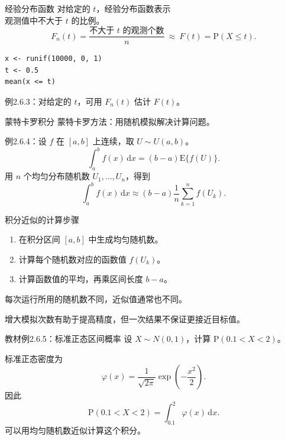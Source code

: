 \documentclass[14pt,compress,t,noamsthm,notheorem,table,handout,fontset=none]{ctexbeamer}
\newcommand{\inputlabel}{\par\smallskip{\fontsize{10.5}{13}\selectfont\bfseries\color{muted}输入代码\par}}
\begin{document}
\begin{frame}[fragile]{经验分布函数}
  对给定的 $t$，经验分布函数表示\\
  观测值中不大于 $t$ 的比例。
  \[
    F_n(t)=\frac{\text{不大于 }t\text{ 的观测个数}}{n}
    \ \approx\ F(t)=\mathrm{P}(X\leq t).
  \]
  \inputlabel
\begin{lstlisting}
x <- runif(10000, 0, 1)
t <- 0.5
mean(x <= t)
\end{lstlisting}
  例2.6.3：对给定的 $t$，可用 $F_n(t)$ 估计 $F(t)$。
\end{frame}

\begin{frame}{蒙特卡罗积分}
  蒙特卡罗方法：用随机模拟解决计算问题。\par\medskip
  例2.6.4：设 $f$ 在 $[a,b]$ 上连续，取 $U\sim U(a,b)$。
  \[
    \int_a^b f(x)\,\mathrm{d}x
    =(b-a)\mathrm{E}\{f(U)\}.
  \]
  用 $n$ 个均匀分布随机数 $U_1,\ldots,U_n$，得到
  \[
    \int_a^b f(x)\,\mathrm{d}x
    \approx (b-a)\frac{1}{n}\sum_{k=1}^n f(U_k).
  \]
\end{frame}

\begin{frame}{积分近似的计算步骤}
  \begin{enumerate}
    \item 在积分区间 $[a,b]$ 中生成均匀随机数。
    \item 计算每个随机数对应的函数值 $f(U_k)$。
    \item 计算函数值的平均，再乘区间长度 $b-a$。
  \end{enumerate}
  \medskip
  每次运行所用的随机数不同，近似值通常也不同。\par\smallskip
  增大模拟次数有助于提高精度，但一次结果不保证更接近目标值。
\end{frame}

\begin{frame}{教材例2.6.5：标准正态区间概率}
  设 $X\sim N(0,1)$，计算 $\mathrm{P}(0.1<X<2)$。\par\medskip
  标准正态密度为
  \[
    \varphi(x)=\frac{1}{\sqrt{2\pi}}\exp\left(-\frac{x^2}{2}\right).
  \]
  因此
  \[
    \mathrm{P}(0.1<X<2)=\int_{0.1}^{2}\varphi(x)\,\mathrm{d}x.
  \]
  可以用均匀随机数近似计算这个积分。
\end{frame}
\end{document}
